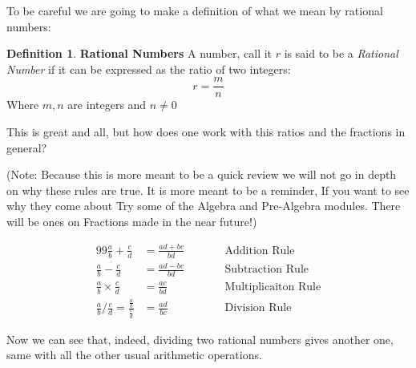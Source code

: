 \documentclass{amsart}
\numberwithin{equation}{section}
\theoremstyle{plain} %
\theoremstyle{definition}
\newtheorem{defn}[equation]{Definition}
\theoremstyle{remark}
\begin{document}
To be careful we are going to make a definition of what we mean by rational numbers:

\begin{defn}{\textbf{Rational Numbers}}
	A number, call it $r$ is said to be a \emph{Rational Number} if it can be expressed as the ratio of two integers:
	\[
	r = \frac{m}{n} 	
	\]
	Where $m,n$ are integers and $n\neq 0$
\end{defn}

This is great and all, but how does one work with this ratios and the fractions in general?

(Note: Because this is more meant to be a quick review we will not go in depth on why these rules are true. It is more meant to be a reminder, If you want to see why they come about Try some of the Algebra and Pre-Algebra
modules. There will be ones on Fractions made in the near future!)


\begin{alignat}{99}
	\frac{a}{b}  + \frac{c}{d} &= \frac{ad + bc}{bd} \qquad && \text{Addition Rule} \\
	\frac{a}{b}  - \frac{c}{d} &= \frac{ad - bc}{bd} \qquad && \text{Subtraction Rule} \\ 
	\frac{a}{b}  \times \frac{c}{d} &= \frac{ac}{bd} && \text{Multiplicaiton Rule} \\
	\frac{a}{b}  /  \frac{c}{d} = \frac{\frac{a}{b}}{\frac{c}{d}}  &= \frac{ad}{bc} && \text{Division Rule}
\end{alignat}

Now we can see that, indeed, dividing two rational numbers gives another one, same with all the other usual arithmetic operations.



\end{document}
